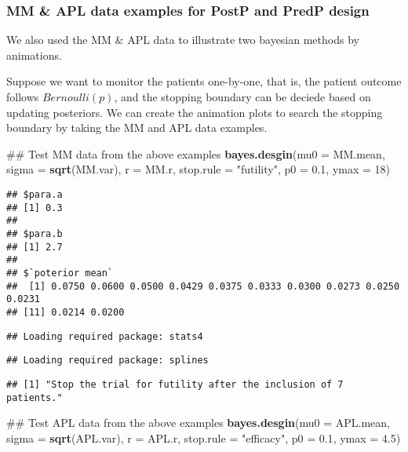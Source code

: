 \documentclass[]{article}
\newenvironment{Shaded}{\begin{snugshade}}{\end{snugshade}}
\newcommand{\KeywordTok}[1]{\textcolor[rgb]{0.13,0.29,0.53}{\textbf{{#1}}}}
\newcommand{\DataTypeTok}[1]{\textcolor[rgb]{0.13,0.29,0.53}{{#1}}}
\newcommand{\DecValTok}[1]{\textcolor[rgb]{0.00,0.00,0.81}{{#1}}}
\newcommand{\FloatTok}[1]{\textcolor[rgb]{0.00,0.00,0.81}{{#1}}}
\newcommand{\StringTok}[1]{\textcolor[rgb]{0.31,0.60,0.02}{{#1}}}
\newcommand{\NormalTok}[1]{{#1}}
\begin{document}
\subsubsection{MM \& APL data examples for PostP and PredP
design}\label{mm-apl-data-examples-for-postp-and-predp-design}

We also used the MM \& APL data to illustrate two bayesian methods by
animations.

Suppose we want to monitor the patients one-by-one, that is, the patient
outcome follows \(Bernoulli(p)\), and the stopping boundary can be
deciede based on updating posteriors. We can create the animation plots
to search the stopping boundary by taking the MM and APL data examples.

\begin{Shaded}
\begin{Highlighting}[]
\NormalTok{## Test MM data from the above examples}
\KeywordTok{bayes.desgin}\NormalTok{(}\DataTypeTok{mu0 =} \NormalTok{MM.mean, }\DataTypeTok{sigma =} \KeywordTok{sqrt}\NormalTok{(MM.var), }\DataTypeTok{r =} \NormalTok{MM.r, }\DataTypeTok{stop.rule =} \StringTok{"futility"}\NormalTok{, }
    \DataTypeTok{p0 =} \FloatTok{0.1}\NormalTok{, }\DataTypeTok{ymax =} \DecValTok{18}\NormalTok{)}
\end{Highlighting}
\end{Shaded}

\begin{verbatim}
## $para.a
## [1] 0.3
## 
## $para.b
## [1] 2.7
## 
## $`poterior mean`
##  [1] 0.0750 0.0600 0.0500 0.0429 0.0375 0.0333 0.0300 0.0273 0.0250 0.0231
## [11] 0.0214 0.0200
\end{verbatim}

\begin{verbatim}
## Loading required package: stats4
\end{verbatim}

\begin{verbatim}
## Loading required package: splines
\end{verbatim}

\begin{verbatim}
## [1] "Stop the trial for futility after the inclusion of 7 patients."
\end{verbatim}


\begin{Shaded}
\begin{Highlighting}[]
\NormalTok{## Test APL data from the above examples}
\KeywordTok{bayes.desgin}\NormalTok{(}\DataTypeTok{mu0 =} \NormalTok{APL.mean, }\DataTypeTok{sigma =} \KeywordTok{sqrt}\NormalTok{(APL.var), }\DataTypeTok{r =} \NormalTok{APL.r, }\DataTypeTok{stop.rule =} \StringTok{"efficacy"}\NormalTok{, }
    \DataTypeTok{p0 =} \FloatTok{0.1}\NormalTok{, }\DataTypeTok{ymax =} \FloatTok{4.5}\NormalTok{)}
\end{Highlighting}
\end{Shaded}
\end{document}
